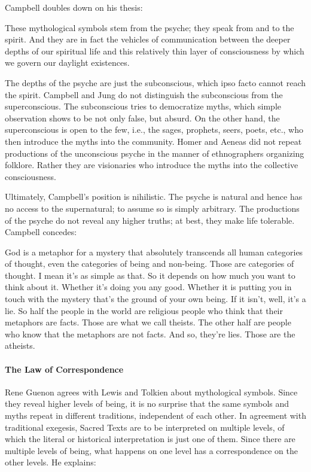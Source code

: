 Campbell doubles down on his thesis:

\begin{quotex}
These mythological symbols stem from the psyche; they speak from and to the spirit. And they are in fact the vehicles of communication between the deeper depths of our spiritual life and this relatively thin layer of consciousness by which we govern our daylight existences.
\end{quotex}


The depths of the psyche are just the subconscious, which ipso facto cannot reach the spirit. Campbell and Jung do not distinguish the subconscious from the superconscious. The subconscious tries to democratize myths, which simple observation shows to be not only false, but absurd. On the other hand, the superconscious is open to the few, i.e., the sages, prophets, seers, poets, etc., who then introduce the myths into the community. Homer and Aeneas did not repeat productions of the unconscious psyche in the manner of ethnographers organizing folklore. Rather they are visionaries who introduce the myths into the collective consciousness.

Ultimately, Campbell's position is nihilistic. The psyche is natural and hence has no access to the supernatural; to assume so is simply arbitrary. The productions of the psyche do not reveal any higher truths; at best, they make life tolerable. Campbell concedes:

\begin{quotex}
God is a metaphor for a mystery that absolutely transcends all human categories of thought, even the categories of being and non-being. Those are categories of thought. I mean it's as simple as that. So it depends on how much you want to think about it. Whether it's doing you any good. Whether it is putting you in touch with the mystery that's the ground of your own being. If it isn't, well, it's a lie. So half the people in the world are religious people who think that their metaphors are facts. Those are what we call theists. The other half are people who know that the metaphors are not facts. And so, they're lies. Those are the atheists.
\end{quotex}


\paragraph{The Law of Correspondence}


Rene Guenon agrees with Lewis and Tolkien about mythological symbols. Since they reveal higher levels of being, it is no surprise that the same symbols and myths repeat in different traditions, independent of each other. In agreement with traditional exegesis, Sacred Texts are to be interpreted on multiple levels, of which the literal or historical interpretation is just one of them. Since there are multiple levels of being, what happens on one level has a correspondence on the other levels. He explains:

